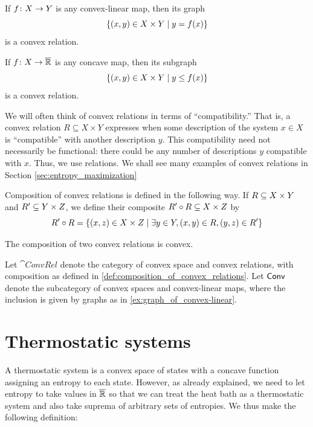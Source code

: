 \documentclass[12pt, reqno]{amsart}
\newcommand{\extreal}{\overline{\real}}
\newcommand{\convrelC}{\cat{ConvRel}}
\begin{document}
\begin{example} \label{ex:graph_of_convex-linear}
    If $f \colon X \rightarrow Y$ is any convex-linear map, then its graph \[\{ (x,y) \in X \times Y \mid y = f(x) \} \] is a convex relation.
\end{example}

\begin{example}
    If $f \maps X \to \extreal$ is any concave map, then its subgraph \[\{ (x, y) \in X \times Y \mid y \leq f(x) \}\] is a convex relation.
\end{example}

We will often think of convex relations in terms of ``compatibility.'' That is, a convex relation $R \subseteq X \times Y$ expresses when some description of the system $x \in X$ is ``compatible'' with another description $y$. This compatibility need not necessarily be functional: there could be any number of descriptions $y$ compatible with $x$. Thus, we use relations.  We shall see many examples of convex relations in Section
\ref{sec:entropy_maximization}

\begin{definition} \label{def:composition_of_convex_relations}
    Composition of convex relations is defined in the following way. If $R \subseteq X \times Y$ and $R' \subseteq Y \times Z$, we define their composite $R' \circ R \subseteq X \times Z$ by
    \[ R' \circ R = \{(x,z) \in X \times Z \mid \exists y \in Y, (x,y) \in R, (y,z) \in R'\} \]
\end{definition}

\begin{proposition} 
   The composition of two convex relations is convex.
\end{proposition}

\begin{definition}
    Let $\convrelC$ denote the category of convex space and convex relations, with composition as defined in \cref{def:composition_of_convex_relations}. Let $\mathsf{Conv}$ denote the subcategory of convex spaces and convex-linear maps, where the inclusion is given by graphs as in \cref{ex:graph_of_convex-linear}.
\end{definition}

\section{Thermostatic systems}
\label{sec:thermostatic_systems}

A thermostatic system is a convex space of states with a concave function assigning an entropy to each state. However, as already explained, we need to let entropy to take values in $\extreal$ so that we can treat the heat bath as a thermostatic system and also take suprema of arbitrary sets of entropies. We thus make the following definition:
\end{document}
